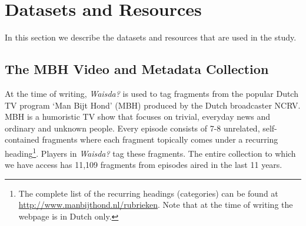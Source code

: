 
\section{Datasets and Resources}\label{sec:materials}
In this section we describe the datasets and resources that are used in the study.
\subsection{The MBH Video and Metadata Collection}\label{sec:video-metadata-collection}
At the time of writing, \textit{Waisda?} is used to %
tag fragments from the popular Dutch TV program `Man Bijt Hond' (MBH) produced by the Dutch broadcaster NCRV.  MBH is a humoristic TV show that focuses on trivial, everyday news and ordinary and unknown people.  Every episode consists of 7-8 unrelated, self-contained fragments where each fragment topically comes under a recurring heading\footnote{The complete list of the recurring headings (categories) can be found at \url{http://www.manbijthond.nl/rubrieken}. Note that at the time of writing the webpage is in Dutch only.}. Players in \textit{Waisda?} tag these fragments.  The entire collection to which we have access has 11,109 fragments from episodes aired in the last 11 years.

